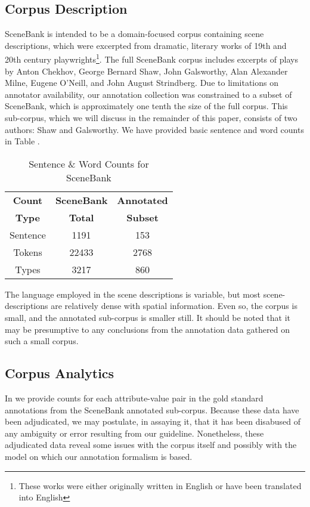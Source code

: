 \documentclass[11pt]{article}
\begin{document}
\subsection{Corpus Description} %
\label{sub:corpus_description}
SceneBank is intended to be a domain-focused corpus containing scene descriptions, which were excerpted from dramatic, literary works of 19th and 20th century playwrights\footnote{These works were either originally written in English or have been translated into English}. The full SceneBank corpus includes excerpts of plays by Anton Chekhov, George Bernard Shaw, John Galsworthy, Alan Alexander Milne, Eugene O'Neill, and John August Strindberg. Due to limitations on annotator availability, our annotation collection was constrained to a subset of SceneBank, which is approximately one tenth the size of the full corpus. This sub-corpus, which we will discuss in the remainder of this paper, consists of two authors: Shaw and Galsworthy. We have provided basic sentence and word counts in Table .

\begin{table}[h]
\begin{center}
\begin{tabular}
    {|c|c|c|}
    \hline \textbf{Count} & \textbf{SceneBank} & \textbf{Annotated}      \\
           \textbf{Type}  & \textbf{Total}     & \textbf{Subset}         \\
    \hline Sentence       & 1191               & 153                     \\
    \hline Tokens         & 22433              & 2768                    \\
    \hline Types          & 3217               & 860                     \\
    \hline
\end{tabular}
\caption{Sentence \& Word Counts for SceneBank}
\label{tab:sent-word-counts}
\end{center}
\end{table}

The language employed in the scene descriptions is variable, but most scene-descriptions are relatively dense with spatial information. Even so, the corpus is small, and the annotated sub-corpus is smaller still. It should be noted that it may be presumptive to any conclusions from the annotation data gathered on such a small corpus.

\subsection{Corpus Analytics} %
\label{sub:corpus_analysis}
In  we provide counts for each attribute-value pair in the gold standard annotations from the SceneBank annotated sub-corpus. Because these data have been adjudicated, we may postulate, in assaying it, that it has been disabused of any ambiguity or error resulting from our guideline. Nonetheless, these adjudicated data reveal some issues with the corpus itself and possibly with the model on which our annotation formalism is based.
\end{document}
